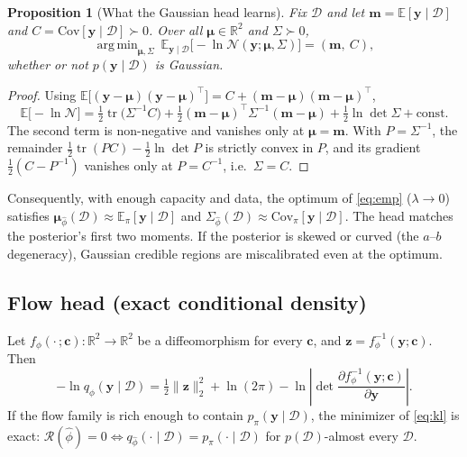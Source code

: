 \documentclass[11pt]{article}
\newtheorem{proposition}{Proposition}
\theoremstyle{definition}
\newcommand{\D}{\mathcal{D}}
\newcommand{\y}{\bm{y}}
\newcommand{\E}{\mathbb{E}}
\newcommand{\R}{\mathbb{R}}
\DeclareMathOperator*{\argmin}{arg\,min}
\DeclareMathOperator{\tr}{tr}
\begin{document}
\begin{proposition}[What the Gaussian head learns]
Fix $\D$ and let $\bm{m}=\E[\y\mid\D]$ and $C=\mathrm{Cov}[\y\mid\D]\succ0$. Over all
$\bm{\mu}\in\R^2$ and $\Sigma\succ0$,
\begin{equation}
  \argmin_{\bm{\mu},\Sigma}\ \E_{\y\mid\D}\big[-\ln\mathcal{N}(\y;\bm{\mu},\Sigma)\big] = (\bm{m},\ C),
\end{equation}
whether or not $p(\y\mid\D)$ is Gaussian.
\end{proposition}
\begin{proof}
Using $\E\big[(\y-\bm{\mu})(\y-\bm{\mu})^{\top}\big] = C + (\bm{m}-\bm{\mu})(\bm{m}-\bm{\mu})^{\top}$,
\begin{equation}
  \E\big[-\ln\mathcal{N}\big] = \tfrac12\tr\!\big(\Sigma^{-1}C\big)
  + \tfrac12(\bm{m}-\bm{\mu})^{\top}\Sigma^{-1}(\bm{m}-\bm{\mu})
  + \tfrac12\ln\det\Sigma + \text{const}.
\end{equation}
The second term is non-negative and vanishes only at $\bm{\mu}=\bm{m}$. With $P=\Sigma^{-1}$,
the remainder $\tfrac12\tr(PC)-\tfrac12\ln\det P$ is strictly convex in $P$, and its gradient
$\tfrac12(C-P^{-1})$ vanishes only at $P=C^{-1}$, i.e.\ $\Sigma=C$.
\end{proof}

Consequently, with enough capacity and data, the optimum of \eqref{eq:emp} ($\lambda\to0$)
satisfies $\bm{\mu}_{\hat\phi}(\D)\approx\E_\pi[\y\mid\D]$ and
$\Sigma_{\hat\phi}(\D)\approx\mathrm{Cov}_\pi[\y\mid\D]$. The head matches the posterior's first
two moments. If the posterior is skewed or curved (the $a$--$b$ degeneracy), Gaussian credible
regions are miscalibrated even at the optimum.

\subsection{Flow head (exact conditional density)}
Let $f_\phi(\cdot\,;\bm{c}):\R^2\to\R^2$ be a diffeomorphism for every $\bm{c}$, and
$\bm{z}=f_\phi^{-1}(\y;\bm{c})$. Then
\begin{equation}
  -\ln q_\phi(\y\mid\D) = \tfrac12\|\bm{z}\|_2^2 + \ln(2\pi)
  - \ln\left|\det \frac{\partial f_\phi^{-1}(\y;\bm{c})}{\partial\y}\right|.
\end{equation}
If the flow family is rich enough to contain $p_\pi(\y\mid\D)$, the minimizer of \eqref{eq:kl}
is exact: $\mathcal{R}(\hat\phi)=0 \iff q_{\hat\phi}(\cdot\mid\D)=p_\pi(\cdot\mid\D)$ for
$p(\D)$-almost every $\D$.

\end{document}
